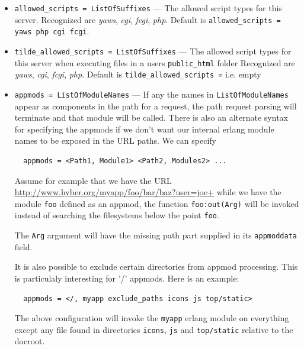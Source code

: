 \documentclass[11pt,oneside,english]{book}
\begin{document}
\begin{itemize}
\item       \verb+allowed_scripts = ListOfSuffixes+ ---
              The allowed script types for this server.  Recognized are
              \textit{yaws}, \textit{cgi}, \textit{fcgi}, \textit{php}.  Default
              is \verb+allowed_scripts = yaws php cgi fcgi+.

\item       \verb+tilde_allowed_scripts = ListOfSuffixes+ ---
             The allowed script types for this server when executing files in a
             users \verb+public_html+ folder Recognized are \textit{yaws},
             \textit{cgi}, \textit{fcgi}, \textit{php}. Default is
             \verb+tilde_allowed_scripts =+ i.e. empty

\item       \verb+appmods = ListOfModuleNames+ ---
             If any the names in \verb+ListOfModuleNames+ appear as components
             in the path for a request, the path request parsing will terminate
             and that module will be called. There is also an alternate syntax
             for specifying the appmods if we don't want our internal erlang
             module names to be exposed in the URL paths.  We can specify
\begin{verbatim}
  appmods = <Path1, Module1> <Path2, Modules2> ...
\end{verbatim}
             Assume for example that we have the URL
             \url{http://www.hyber.org/myapp/foo/bar/baz?user=joe+} while we
             have the module \verb+foo+ defined as an appmod, the function
             \verb+foo:out(Arg)+ will be invoked instead of searching the
             filesystems below the point \verb+foo+.

             The \verb+Arg+ argument will have the missing path part supplied in
             its \verb+appmoddata+ field.

             It is also possible to exclude certain directories from appmod
             processing. This is particulaly interesting for '/' appmods.  Here
             is an example:
\begin{verbatim}
  appmods = </, myapp exclude_paths icons js top/static>
\end{verbatim}
             The above configuration will invoke the \verb+myapp+ erlang module
             on everything except any file found in directories \verb+icons+,
             \verb+js+ and \verb+top/static+ relative to the docroot.


\end{itemize}
\end{document}
